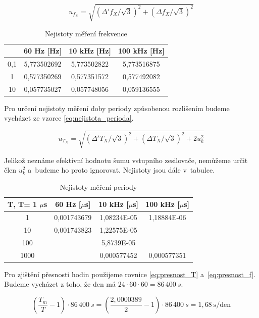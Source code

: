 \documentclass[a4paper,12pt]{article}   %
\newcommand{\tmu}{$\mu$}
\begin{document}
\begin{equation}
  u_{f_X} = \sqrt{\left(\Delta'f_X/\sqrt{3}\right)^2+\left(\Delta f_X/\sqrt{3}\right)^2}
  \label{eq:nejistota_frce}
\end{equation}

\begin{table}
  \centering
  \begin{tabular}{|c|c|c|c|}
    \hline
    &60 Hz [Hz]&10 kHz [Hz]&100 kHz [Hz]\\\hline\hline
    0,1&5,773502692&5,773502822&5,773516875\\\hline
    1&0,577350269&0,577351572&0,577492082\\\hline
    10&0,057735027&0,057748056&0,059136555\\\hline
  \end{tabular}
  \caption{Nejistoty měření frekvence}
\end{table}

Pro určení nejistoty měření doby periody způsobenou rozlišením budeme vycházet ze vzorce \ref{eq:nejistota_perioda}.

\begin{equation}
  u_{T_X} = \sqrt{\left(\Delta'T_X/\sqrt{3}\right)^2+\left(\Delta T_X/\sqrt{3}\right)^2+2u_k^2}
  \label{eq:nejistota_perioda}
\end{equation}

Jelikož neznáme efektivní hodnotu šumu vstupního zesilovače, nemůžeme určit člen $u_k^2$ a~budeme ho proto ignorovat. Nejistoty jsou dále v~tabulce.

\begin{table}[h!]
  \centering
  \begin{tabular}{|c|c|c|c|}
    \hline
    T, T= 1 \tmu s&60 Hz [\tmu s]&10 kHz [\tmu s]&100 kHz [\tmu s]\\\hline\hline
    1&0,001743679&1,08234E-05&1,18884E-06\\\hline
    10&0,001743823&1,22575E-05&\\\hline
    100&&5,8739E-05&\\\hline
    1000&&0,000577452&0,000577351\\\hline
  \end{tabular}
  \caption{Nejistoty měření periody}
\end{table}

Pro zjištění přesnosti hodin použijeme rovnice \ref{eq:presnost_T} a~\ref{eq:presnost_f}. Budeme vycházet z toho, že den má $24\cdot 60\cdot 60 = 86\,400~s$. 

\begin{equation}
  \left(\frac{T_m}{T}-1\right)\cdot 86\,400~s = \left(\frac{2,0000389}{2}-1\right)\cdot 86\,400~s = 1,68~\textrm{s/den}
  \label{eq:presnost_T}
\end{equation}
\end{document}
